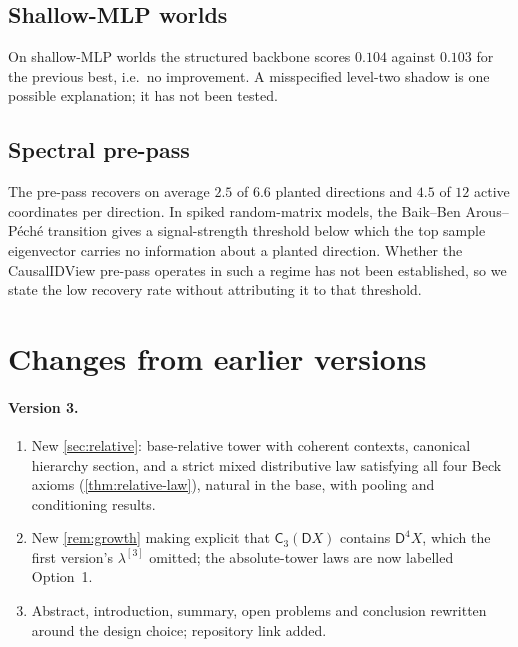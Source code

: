 \documentclass[11pt]{article}
\theoremstyle{definition}
\theoremstyle{remark}
\newcommand{\D}{\mathsf{D}}
\newcommand{\C}{\mathsf{C}}
\begin{document}
\subsection{Shallow-MLP worlds}
On shallow-MLP worlds the structured backbone scores $0.104$ against $0.103$ for the previous best,
i.e.\ no improvement. A misspecified level-two shadow is one possible explanation; it has not been
tested.

\subsection{Spectral pre-pass}
The pre-pass recovers on average $2.5$ of $6.6$ planted directions and $4.5$ of $12$ active
coordinates per direction. In spiked random-matrix models, the Baik--Ben Arous--P\'ech\'e transition
\cite{BBP2005} gives a signal-strength threshold below which the top sample eigenvector carries no
information about a planted direction. Whether the CausalIDView pre-pass operates in such a regime has
not been established, so we state the low recovery rate without attributing it to that threshold.

\section{Changes from earlier versions}\label{app:changes}

\paragraph{Version 3.}
\begin{enumerate}[leftmargin=*,label=(\alph*)]
\item New \cref{sec:relative}: base-relative tower with coherent contexts, canonical hierarchy
  section, and a strict mixed distributive law satisfying all four Beck axioms
  (\cref{thm:relative-law}), natural in the base, with pooling and conditioning results.
\item New \cref{rem:growth} making explicit that $\C_3(\D X)$ contains $\D^4X$, which the first
  version's $\lambda^{[3]}$ omitted; the absolute-tower laws are now labelled Option~1.
\item Abstract, introduction, summary, open problems and conclusion rewritten around the design
  choice; repository link added.
\end{enumerate}
\end{document}
